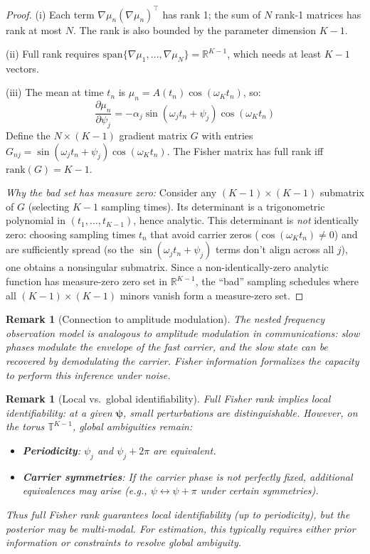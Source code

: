 \documentclass[12pt]{article}
\newtheorem{remark}[theorem]{Remark}
\newcommand{\R}{\mathbb{R}}
\newcommand{\T}{\mathbb{T}}
\begin{document}
\begin{proof}
(i) Each term $\nabla \mu_n (\nabla \mu_n)^\top$ has rank 1; the sum of $N$ rank-1 matrices has rank at most $N$. The rank is also bounded by the parameter dimension $K-1$.

(ii) Full rank requires $\mathrm{span}\{\nabla \mu_1, \ldots, \nabla \mu_N\} = \R^{K-1}$, which needs at least $K-1$ vectors.

(iii) The mean at time $t_n$ is $\mu_n = A(t_n)\cos(\omega_K t_n)$, so:
\[
\frac{\partial \mu_n}{\partial \psi_j} = -\alpha_j \sin(\omega_j t_n + \psi_j) \cos(\omega_K t_n)
\]
Define the $N \times (K-1)$ gradient matrix $G$ with entries $G_{nj} = \sin(\omega_j t_n + \psi_j)\cos(\omega_K t_n)$. The Fisher matrix has full rank iff $\mathrm{rank}(G) = K-1$.

\emph{Why the bad set has measure zero:} Consider any $(K-1) \times (K-1)$ submatrix of $G$ (selecting $K-1$ sampling times). Its determinant is a trigonometric polynomial in $(t_1, \ldots, t_{K-1})$, hence analytic. This determinant is \emph{not} identically zero: choosing sampling times $t_n$ that avoid carrier zeros ($\cos(\omega_K t_n) \neq 0$) and are sufficiently spread (so the $\sin(\omega_j t_n + \psi_j)$ terms don't align across all $j$), one obtains a nonsingular submatrix. Since a non-identically-zero analytic function has measure-zero zero set in $\R^{K-1}$, the ``bad'' sampling schedules where all $(K-1) \times (K-1)$ minors vanish form a measure-zero set.
\end{proof}

\begin{remark}[Connection to amplitude modulation]
The nested frequency observation model is analogous to amplitude modulation in communications: slow phases modulate the envelope of the fast carrier, and the slow state can be recovered by demodulating the carrier. Fisher information formalizes the capacity to perform this inference under noise.
\end{remark}

\begin{remark}[Local vs.\ global identifiability]
\label{rem:local_global}
Full Fisher rank implies \emph{local} identifiability: at a given $\bm{\psi}$, small perturbations are distinguishable. However, on the torus $\T^{K-1}$, global ambiguities remain:
\begin{itemize}
    \item \textbf{Periodicity}: $\psi_j$ and $\psi_j + 2\pi$ are equivalent.
    \item \textbf{Carrier symmetries}: If the carrier phase is not perfectly fixed, additional equivalences may arise (e.g., $\psi \leftrightarrow \psi + \pi$ under certain symmetries).
\end{itemize}
Thus full Fisher rank guarantees local identifiability (up to periodicity), but the posterior may be multi-modal. For estimation, this typically requires either prior information or constraints to resolve global ambiguity.
\end{remark}
\end{document}
